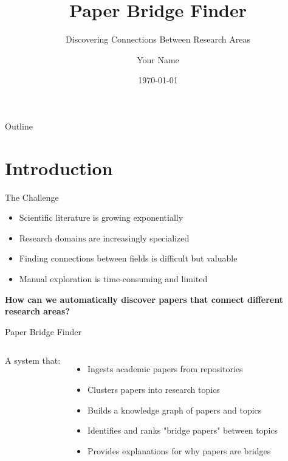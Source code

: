 \documentclass{beamer}
\title{Paper Bridge Finder}
\subtitle{Discovering Connections Between Research Areas}
\author{Your Name}
\institute{Your Institution}
\date{\today}
\begin{document}
\begin{frame}
    \titlepage
\end{frame}

\begin{frame}{Outline}
    \tableofcontents
\end{frame}

\section{Introduction}

\begin{frame}{The Challenge}
    \begin{itemize}
        \item Scientific literature is growing exponentially
        \item Research domains are increasingly specialized
        \item Finding connections between fields is difficult but valuable
        \item Manual exploration is time-consuming and limited
    \end{itemize}
    
    \vspace{0.5cm}
    \begin{center}
        \textbf{How can we automatically discover papers that connect different research areas?}
    \end{center}
\end{frame}

\begin{frame}{Paper Bridge Finder}
    \begin{columns}
        A system that:
        \begin{itemize}
            \item Ingests academic papers from repositories
            \item Clusters papers into research topics
            \item Builds a knowledge graph of papers and topics
            \item Identifies and ranks "bridge papers" between topics
            \item Provides explanations for why papers are bridges
        \end{itemize}
        
        \begin{center}
        \end{center}
    \end{columns}
\end{frame}
\end{document}

